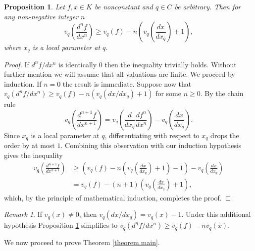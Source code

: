 \documentclass{amsart}
\newtheorem{prop}[theorem]{Proposition}
\theoremstyle{definition}
\theoremstyle{remark}
\newtheorem{remark}[theorem]{Remark}
\numberwithin{equation}{section}
\begin{document}
\begin{prop}\label{prop.valuations}
Let $f, x\in K$ be nonconstant and $q\in C$ be arbitrary. Then for any non-negative integer $n$
\[
v_q\left(\frac{d^nf}{dx^n}\right) \geq v_q(f)-n\left(v_q\left(\frac{dx}{dx_q}\right)+1\right),
\]
where $x_q$ is a local parameter at $q$.
\end{prop}

\begin{proof}
If $d^nf/dx^n$ is identically $0$ then the inequality trivially holds. Without further mention we will assume that all valuations are finite. We proceed by induction. If $n=0$ the result is immediate. Suppose now that $v_q\left(d^nf/dx^n\right) \geq v_q(f)-n(v_q(dx/dx_q)+1)$ for some $n\geq 0$. By the chain rule
\[
v_q\left(\frac{d^{n+1}f}{dx^{n+1}}\right) = v_q\left(\frac{d}{dx_q}\frac{df^n}{dx^n}\right)-v_q\left(\frac{dx}{dx_q}\right).
\]
Since $x_q$ is a local parameter at $q$, differentiating with respect to $x_q$ drops the order by at most $1$. Combining this observation with our induction hypothesis gives the inequality
\begin{align*}
v_q\left(\frac{d^{n+1}f}{dx^{n+1}}\right) &\geq \left(v_q(f)-n\left(v_q\left(\frac{dx}{dx_q}\right)+1\right)-1\right)-v_q\left(\frac{dx}{dx_q}\right)\\
&= v_q(f)-(n+1)\left(v_q\left(\frac{dx}{dx_q}\right)+1\right),
\end{align*}
which, by the principle of mathematical induction, completes the proof.
\end{proof}

\begin{remark}\label{remark.insupport}
If $v_q(x) \neq 0$, then  $v_q(dx/dx_q) = v_q(x)-1$. Under this additional hypothesis Proposition \ref{prop.valuations} simplifies to $v_q(d^nf/dx^n) \geq v_q(f)-nv_q(x)$.
\end{remark}

We now proceed to prove Theorem \ref{theorem.main}.
\end{document}
